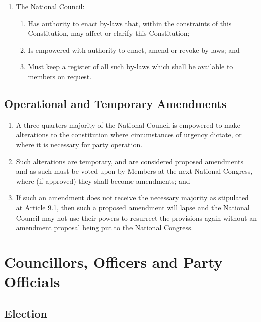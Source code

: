 \documentclass[a4paper,titlepage,8.5pt]{article}
\begin{document}
\begin{enumerate}
\item The National Council:
\begin{enumerate}
\item Has authority to enact by-laws that, within the constraints of this Constitution, may affect or clarify this Constitution;
\item Is empowered with authority to enact, amend or revoke by-laws; and
\item Must keep a register of all such by-laws which shall be available to members on request.
\end{enumerate}
\end{enumerate}

\subsection{Operational and Temporary Amendments}

\begin{enumerate}
\item A three-quarters majority of the National Council is empowered to make alterations to the constitution where circumstances of urgency dictate, or where it is necessary for party operation.
\item Such alterations are temporary, and are considered proposed amendments and as such must be voted upon by Members at the next National Congress, where (if approved) they shall become amendments; and
\item If such an amendment does not receive the necessary majority as stipulated at Article 9.1, then such a proposed amendment will lapse and the National Council may not use their powers to resurrect the provisions again without an amendment proposal being put to the National Congress.
\end{enumerate}

\section{Councillors, Officers and Party Officials}

\subsection{Election}
\end{document}
